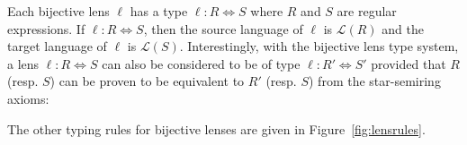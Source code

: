 \documentclass[acmsmall,review,anonymous]{acmart}
\begin{document}
Each bijective lens $\ell$ has a type $\ell : R \Leftrightarrow S$ where $R$ and
$S$ are regular expressions. If $\ell : R \Leftrightarrow S$, then the source
language of $\ell$ is $\mathcal{L}(R)$ and the target language of $\ell$ is
$\mathcal{L}(S)$. Interestingly, with the bijective lens type system, a lens
$\ell : R \Leftrightarrow S$ can also be considered to be of type $\ell : R'
\Leftrightarrow S'$ provided that $R$ (resp. $S$) can be proven to be
equivalent to $R'$ (resp. $S$) from the star-semiring axioms:

\begin{prooftree}
\end{prooftree}

The other typing rules for bijective lenses are given in
Figure~\ref{fig:lensrules}.
\end{document}
